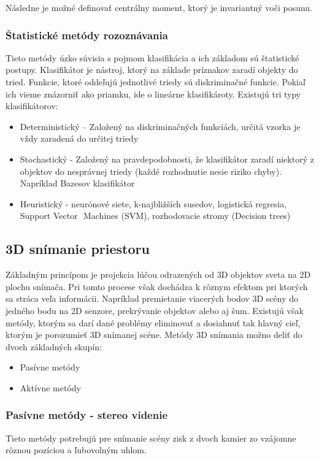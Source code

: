 Následne je možné definovať centrálny moment, ktorý je invariantný voči posunu. 


\subsubsection{Štatistické metódy rozoznávania}
Tieto metódy úzko súvisia s pojmom klasifikácia a ich základom sú štatistické postupy. Klasifikátor je nástroj, ktorý na základe príznakov zaradí objekty do tried. Funkcie, ktoré oddeľujú jednotlivé triedy sú diskriminačné funkcie. Pokiaľ ich vieme znázorniť ako priamku, ide o lineárne klasifikároty. Existujú tri typy klasifikátorov: 

\begin{itemize}
\item Deterministický  – Založený na diskriminačných funkciách, určitá vzorka je vždy zaradená do určitej triedy 
\item Stochastický -  Založený na pravdepodobnosti, že klasifikátor zaradí niektorý z objektov do nesprávnej triedy (každé rozhodnutie nesie riziko chyby).  Napríklad Bazesov klasifikátor
\item Heuristický - neurónové siete, k-najbližších susedov, logistická regresia, Support Vector  Machines (SVM), rozhodovacie stromy (Decision trees) 
\end{itemize}

\subsection{3D snímanie priestoru}
Základným princípom je projekcia lúčou odrazených od 3D objektov sveta na 2D plochu snímača. Pri tomto procese však dochádza k rôznym efektom pri ktorých sa stráca veľa informácii. Napríklad premietanie viacerých bodov 3D scény do jedného bodu na 2D senzore, prekrývanie objektov alebo aj šum. Existujú však metódy, ktorým sa darí dané problémy eliminovať a dosiahnuť tak  hlavný cieľ, ktorým je porozumieť 3D snímanej scéne. Metódy 3D snímania možno deliť do dvoch základných skupín: 

\begin{itemize}
\item Pasívne metódy
\item Aktívne metódy 
\end{itemize}

\subsubsection{Pasívne metódy - stereo videnie}
Tieto metódy potrebujú pre snímanie scény zisk z dvoch kamier zo vzájomne rôznou pozíciou a ľubovolným uhlom. 

